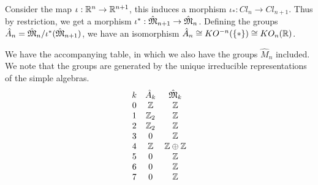 \begin{theorem}\label{abstheorem}
	Consider the map $\iota:\mathbb{R}^n\to \mathbb{R}^{n+1}$, this induces a morphism $\iota_*:Cl_n\to Cl_{n+1}$. Thus by restriction, we get a morphism $\iota^*:\hat{\mathfrak{M}}_{n+1}\to \hat{\mathfrak{M}}_n$. Defining the groups $\hat{A}_n=\hat{\mathfrak{M}}_{n}/\iota^*(\hat{\mathfrak{M}}_{n+1})$, we have an isomorphism $\hat{A}_n\cong KO^{-n}(\{ * \})\cong KO_{n}(\mathbb{R})$. 
\end{theorem}
We have the accompanying table, in which we also have the groups $\hat{M}_n$ included. We note that the groups are generated by the unique irreducible representations of the simple algebras.
\begin{align*} 
\begin{array}{c c c}
k & \hat{A}_k & \hat{\mathfrak{M}}_k \\ 
0 & \mathbb{Z} & \mathbb{Z} \\
1 & \mathbb{Z}_2 & \mathbb{Z} \\
2 & \mathbb{Z}_2 & \mathbb{Z} \\
3 & 0 & \mathbb{Z} \\
4 & \mathbb{Z} & \mathbb{Z}\oplus \mathbb{Z} \\
5 & 0 & \mathbb{Z} \\
6 & 0 & \mathbb{Z} \\
7 & 0 & \mathbb{Z} 
\end{array}
\end{align*}